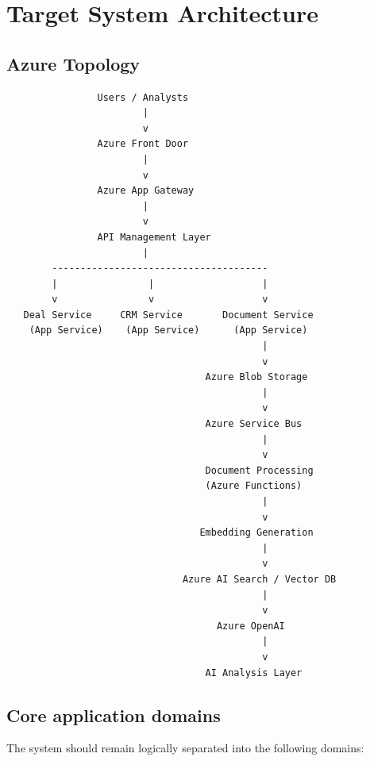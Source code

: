 \documentclass[11pt]{article}
\begin{document}
\section{Target System Architecture}

\subsection{Azure Topology}

\begin{verbatim}
                Users / Analysts
                        |
                        v
                Azure Front Door
                        |
                        v
                Azure App Gateway
                        |
                        v
                API Management Layer
                        |
        --------------------------------------
        |                |                   |
        v                v                   v
   Deal Service     CRM Service       Document Service
    (App Service)    (App Service)      (App Service)
                                             |
                                             v
                                   Azure Blob Storage
                                             |
                                             v
                                   Azure Service Bus
                                             |
                                             v
                                   Document Processing
                                   (Azure Functions)
                                             |
                                             v
                                  Embedding Generation
                                             |
                                             v
                               Azure AI Search / Vector DB
                                             |
                                             v
                                     Azure OpenAI
                                             |
                                             v
                                   AI Analysis Layer
\end{verbatim}

\subsection{Core application domains}

The system should remain logically separated into the following domains:
\end{document}
